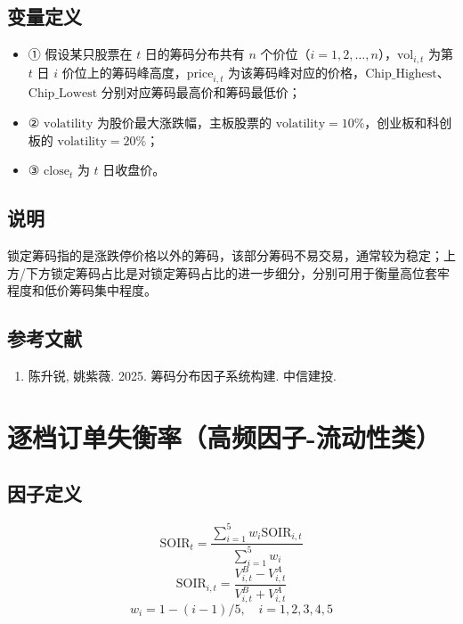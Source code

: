 \documentclass{article}
\begin{document}
\subsection{变量定义}
\begin{itemize}
    \item ① 假设某只股票在 \( t \) 日的筹码分布共有 \( n \) 个价位（\( i = 1, 2, \ldots, n \)），\( \mathrm{vol}_{i,t} \) 为第 \( t \) 日 \( i \) 价位上的筹码峰高度，\( \mathrm{price}_{i,t} \) 为该筹码峰对应的价格，\( \mathrm{Chip\_Highest} \)、\( \mathrm{Chip\_Lowest} \) 分别对应筹码最高价和筹码最低价；
    \item ② \( \mathrm{volatility} \) 为股价最大涨跌幅，主板股票的 \( \mathrm{volatility} = 10\% \)，创业板和科创板的 \( \mathrm{volatility} = 20\% \)；
    \item ③ \( \mathrm{close}_t \) 为 \( t \) 日收盘价。
\end{itemize}

\subsection{说明}
锁定筹码指的是涨跌停价格以外的筹码，该部分筹码不易交易，通常较为稳定；上方/下方锁定筹码占比是对锁定筹码占比的进一步细分，分别可用于衡量高位套牢程度和低价筹码集中程度。

\subsection{参考文献}
\begin{enumerate}
    \item 陈升锐, 姚紫薇. 2025. 筹码分布因子系统构建. 中信建投.
\end{enumerate}

\section{逐档订单失衡率（高频因子-流动性类）}

\subsection{因子定义}
\begin{equation}
    \mathrm{SOIR}_t = \frac{\sum_{i=1}^{5} w_i \mathrm{SOIR}_{i,t}}{\sum_{i=1}^{5} w_i}
\end{equation}
\begin{equation}
    \mathrm{SOIR}_{i,t} = \frac{V_{i,t}^B - V_{i,t}^A}{V_{i,t}^B + V_{i,t}^A}
\end{equation}
\begin{equation}
    w_i = 1 - (i - 1)/5, \quad i = 1, 2, 3, 4, 5
\end{equation}
\end{document}
